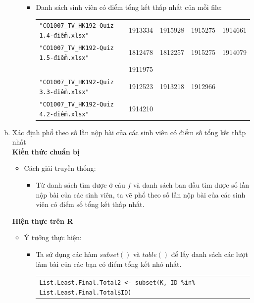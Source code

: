 \documentclass[a4paper]{article}
\theoremstyle{definition}
\begin{document}
\begin{enumerate}[a)]
\begin{itemize}
        \begin{itemize}
            \item Danh sách sinh viên có điểm tổng kết thấp nhất của mỗi file:
            \begin{center}
                \begin{tabular}{l c c c c}
                     \texttt{"CO1007\_TV\_HK192-Quiz 1.4-điểm.xlsx"} & 1913334 & 1915928 & 1915275 & 1914661\\
                     \texttt{"CO1007\_TV\_HK192-Quiz 1.5-điểm.xlsx"} & 1812478 & 1812257 & 1915275 & 1914079\\
                     & 1911975\\
                     \texttt{"CO1007\_TV\_HK192-Quiz 3.3-điểm.xlsx"} & 1912523 & 1913218 & 1912966\\
                     \texttt{"CO1007\_TV\_HK192-Quiz 4.2-điểm.xlsx"} & 1914210
                \end{tabular}
            \end{center}
        \end{itemize}
    \end{itemize}
    \bf\item {Xác định phổ theo số lần nộp bài của các sinh viên có điểm số tổng kết thấp nhất}\\[6pt]
    \bf Kiến thức chuẩn bị\normalfont
    \begin{itemize}
        \item Cách giải truyền thống:
        \begin{itemize}
            \item Từ danh sách tìm được ở câu $f$ và danh sách ban đầu tìm được số lần nộp bài của các sinh viên, ta vẽ phổ theo số lần nộp bài của các sinh viên có điểm số tổng kết thấp nhất.
        \end{itemize}
    \end{itemize}
    \bf Hiện thực trên R\normalfont
    \begin{itemize}
        \item Ý tưởng thực hiện:
        \begin{itemize}
            \item Ta sử dụng các hàm $subset()$ và $table()$ để lấy danh sách các lượt làm bài của các bạn có điểm tổng kết nhỏ nhất.
            \begin{center}
                \begin{tabular}{p{13cm}}
                    \texttt{List.Least.Final.Total2 <- subset(K, ID \%in\% List.Least.Final.Total\$ID)}

\end{tabular}
\end{center}
\end{itemize}
\end{itemize}
\end{enumerate}
\end{document}
